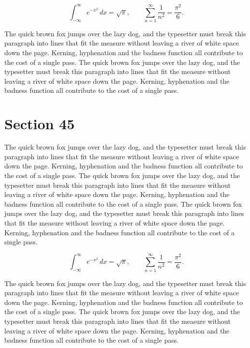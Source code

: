 \documentclass{article}
\begin{document}
\begin{equation}
\int_{-\infty}^{\infty} e^{-x^{2}}\,dx = \sqrt{\pi}, \qquad
\sum_{n=1}^{\infty} \frac{1}{n^{2}} = \frac{\pi^{2}}{6}.
\end{equation}

The quick brown fox jumps over the lazy dog, and the typesetter must break this paragraph into lines that fit the measure without leaving a river of white space down the page. Kerning, hyphenation and the badness function all contribute to the cost of a single pass. The quick brown fox jumps over the lazy dog, and the typesetter must break this paragraph into lines that fit the measure without leaving a river of white space down the page. Kerning, hyphenation and the badness function all contribute to the cost of a single pass. 
\section{Section 45}
The quick brown fox jumps over the lazy dog, and the typesetter must break this paragraph into lines that fit the measure without leaving a river of white space down the page. Kerning, hyphenation and the badness function all contribute to the cost of a single pass. The quick brown fox jumps over the lazy dog, and the typesetter must break this paragraph into lines that fit the measure without leaving a river of white space down the page. Kerning, hyphenation and the badness function all contribute to the cost of a single pass. The quick brown fox jumps over the lazy dog, and the typesetter must break this paragraph into lines that fit the measure without leaving a river of white space down the page. Kerning, hyphenation and the badness function all contribute to the cost of a single pass. 

\begin{equation}
\int_{-\infty}^{\infty} e^{-x^{2}}\,dx = \sqrt{\pi}, \qquad
\sum_{n=1}^{\infty} \frac{1}{n^{2}} = \frac{\pi^{2}}{6}.
\end{equation}

The quick brown fox jumps over the lazy dog, and the typesetter must break this paragraph into lines that fit the measure without leaving a river of white space down the page. Kerning, hyphenation and the badness function all contribute to the cost of a single pass. The quick brown fox jumps over the lazy dog, and the typesetter must break this paragraph into lines that fit the measure without leaving a river of white space down the page. Kerning, hyphenation and the badness function all contribute to the cost of a single pass. 
\end{document}
